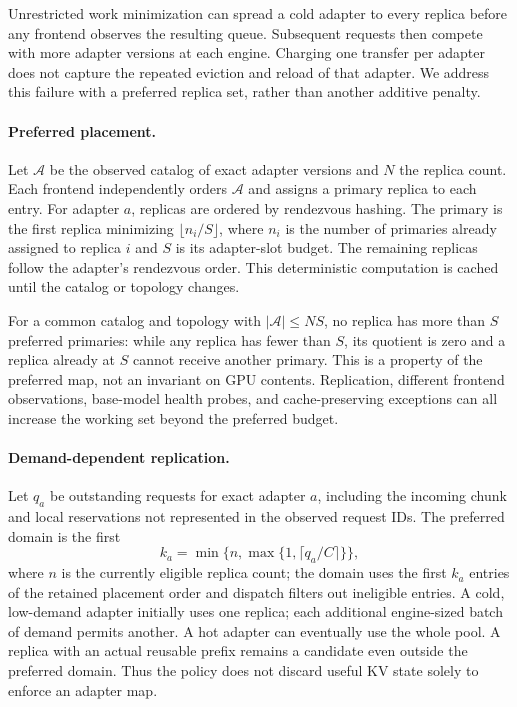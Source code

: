 Unrestricted work minimization can spread a cold adapter to every replica before
any frontend observes the resulting queue. Subsequent requests then compete with
more adapter versions at each engine. Charging one transfer per adapter does not
capture the repeated eviction and reload of that adapter. We address this
failure with a preferred replica set, rather than another additive penalty.

\paragraph{Preferred placement.}
Let $\mathcal A$ be the observed catalog of exact adapter versions and $N$ the
replica count. Each frontend independently orders $\mathcal A$ and assigns a
primary replica to each entry. For adapter $a$, replicas are ordered by
rendezvous hashing. The primary is the first replica minimizing
$\lfloor n_i/S\rfloor$, where $n_i$ is the number of primaries already assigned
to replica $i$ and $S$ is its adapter-slot budget. The remaining replicas follow
the adapter's rendezvous order. This deterministic computation is cached until
the catalog or topology changes.

For a common catalog and topology with $|\mathcal A|\le NS$, no replica has more
than $S$ preferred primaries: while any replica has fewer than $S$, its quotient
is zero and a replica already at $S$ cannot receive another primary. This is a
property of the preferred map, not an invariant on GPU contents. Replication,
different frontend observations, base-model health probes, and cache-preserving
exceptions can all increase the working set beyond the preferred budget.

\paragraph{Demand-dependent replication.}
Let $q_a$ be outstanding requests for exact adapter $a$, including the incoming
chunk and local reservations not represented in the observed request IDs. The
preferred domain is the first
\begin{equation}
 k_a=\min\{n,\max\{1,\lceil q_a/C\rceil\}\},
\end{equation}
where $n$ is the currently eligible replica count; the domain uses the first
$k_a$ entries of the retained placement order and dispatch filters out ineligible
entries. A cold, low-demand adapter initially uses one
replica; each additional engine-sized batch of demand permits another. A hot
adapter can eventually use the whole pool. A replica with an actual reusable
prefix remains a candidate even outside the preferred domain. Thus the policy
does not discard useful KV state solely to enforce an adapter map.

